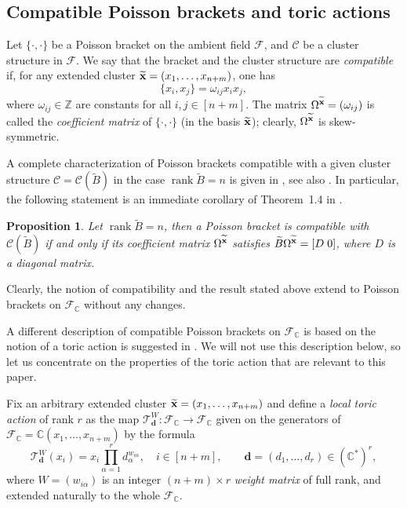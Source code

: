 \documentclass{amsart}
\newtheorem{proposition}[theorem]{Proposition}
\theoremstyle{definition}
\theoremstyle{remark}
\numberwithin{equation}{section}
\numberwithin{theorem}{section}
\begin{document}
\subsection{Compatible Poisson brackets and toric actions}
Let ${{\{\cdot,\cdot\}}}$ be a Poisson bracket on the ambient field ${{\mathcal F}}$, and ${{\mathcal C}}$ be a cluster structure in ${{\mathcal F}}$. 
We say that the bracket and the cluster structure are {\em compatible\/} if, for any extended
cluster $\widetilde{{\bf x}}=(x_1,\dots,x_{n+m})$,  one has
\begin{equation}\label{cpt}
\{x_i,x_j\}=\omega_{ij} x_ix_j,
\end{equation}
where $\omega_{ij}\in{{\mathbb Z}}$ are
constants for all $i,j\in[n+m]$. The matrix
$\Omega^{\widetilde {{\bf x}}}=(\omega_{ij})$ is called the {\it coefficient matrix\/}
of ${{\{\cdot,\cdot\}}}$ (in the basis $\widetilde {{\bf x}}$); clearly, $\Omega^{\widetilde {{\bf x}}}$ is
skew-symmetric.

A complete characterization of Poisson brackets compatible with a given cluster structure ${{\mathcal C}}={{\mathcal C}}({{\widetilde{B}}})$ in the case ${\operatorname{rank}}{{\widetilde{B}}}=n$ is given in \cite{GSV1}, see also \cite[Ch.~4]{GSVb}. In particular, the following statement is an 
immediate corollary of Theorem~1.4  in \cite{GSV1}.

\begin{proposition}\label{Bomega}
Let ${\operatorname{rank}} {{\widetilde{B}}}=n$, then
a Poisson bracket is compatible with ${{\mathcal C}}({{\widetilde{B}}})$ if and only if its coefficient matrix 
$\Omega^{{\widetilde{\bf x}}}$ satisfies ${{\widetilde{B}}}\Omega^{{\widetilde{\bf x}}}=[D\; 0]$, where $D$ is a diagonal matrix.
\end{proposition}

Clearly, the notion of compatibility and the result stated above extend to Poisson brackets on ${{\mathcal F}}_{{\mathbb C}}$ without any changes.

A different description of compatible Poisson brackets on ${{\mathcal F}}_{{\mathbb C}}$ is based on the notion of a toric action is suggested
in \cite[Proposition~2.2]{GSSV}. We will not use this description below, so let us concentrate on the properties of the toric 
action that are relevant to this paper.

 Fix an arbitrary extended cluster
${{\widetilde{\bf x}}}=(x_1,\dots,x_{n+m})$ and define a {\it local toric action\/} of rank $r$ as the map 
${{\mathcal T}}^W_{\mathbf d}:{{\mathcal F}}_{{\mathbb C}}\to
{{\mathcal F}}_{{\mathbb C}}$ given on the generators of ${{\mathcal F}}_{{\mathbb C}}={{\mathbb C}}(x_1,\dots,x_{n+m})$ by the formula 
\begin{equation}
{{\mathcal T}}^W_{\mathbf d}(x_i)=x_i \prod_{\alpha=1}^r d_\alpha^{w_{i\alpha}},\quad i\in [n+m],\qquad
{\mathbf d}=(d_1,\dots,d_r)\in ({{\mathbb C}}^*)^r,
\label{toricact}
\end{equation}
where $W=(w_{i\alpha})$ is an integer $(n+m)\times r$ {\it weight matrix\/} of full rank, and extended naturally to the whole ${{\mathcal F}}_{{\mathbb C}}$. 
\end{document}
